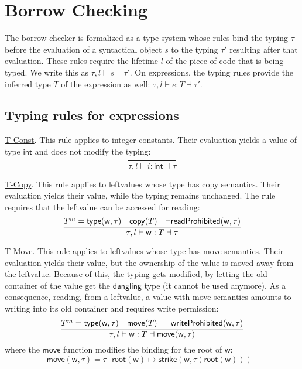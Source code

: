 \section{Borrow Checking}\label{sec:borrow_checker}

The borrow checker is formalized as a type system whose rules
bind the typing $\tau$ before the evaluation of a syntactical object $s$ to
the typing $\tau'$ resulting after that evaluation.
These rules require the lifetime $l$ of the piece of code that is being typed.
We write this as $\tau,l\vdash s\dashv\tau'$.
On expressions, the typing
rules provide the inferred type $T$ of the expression as well:
$\tau,l\vdash e:T\dashv\tau'$.

\subsection{Typing rules for expressions}

\underline{\textsf{T-Const}}.
This rule applies to integer constants. Their evaluation
yields a value of type $\mathsf{int}$ and does not modify the typing:
\[
\frac
    {}
    {\tau,l\vdash i:\mathsf{int}\dashv\tau}
\]

\noindent
\underline{\textsf{T-Copy}}.
This rule applies to leftvalues whose type
has copy semantics. Their evaluation yields their value, while
the typing remains unchanged. The rule requires that the leftvalue
can be accessed for reading:
\[
\frac
    {T^m=\mathsf{type}(\mathsf{w},\tau)\quad\mathsf{copy}(T)\quad\neg\mathsf{readProhibited}(\mathsf{w},\tau)}
    {\tau,l\vdash\mathsf{w}:T\dashv\tau}
\]

\noindent
\underline{\textsf{T-Move}}.
This rule applies to leftvalues whose type
has move semantics. Their evaluation yields their value,
but the ownership of the value is moved away from the leftvalue. Because of this,
the typing gets modified, by letting the old container of the value
get the $\mathsf{dangling}$ type (it cannot be used anymore).
As a consequence, reading, from a leftvalue, a value with move semantics
amounts to writing into its old container and requires write permission:
\[
\frac
    {T^m=\mathsf{type}(\mathsf{w},\tau)\quad\mathsf{move}(T)\quad\neg\mathsf{writeProhibited}(\mathsf{w},\tau)}
    {\tau,l\vdash\mathsf{w}:T\dashv\mathsf{move}(\mathsf{w},\tau)}
\]
where the $\mathsf{move}$ function
modifies the binding for the root of $\mathsf{w}$:
\[
\mathsf{move}(\mathsf{w},\tau)=\tau[\mathsf{root}(\mathsf{w})\mapsto
  \mathsf{strike}(\mathsf{w},\tau(\mathsf{root}(\mathsf{w})))]
\]

